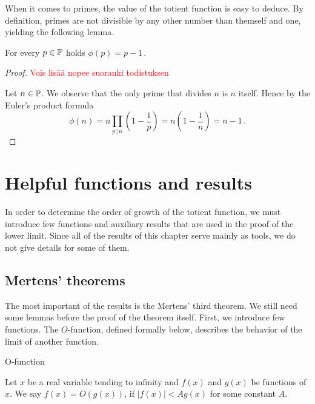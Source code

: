 \documentclass{article}
\begin{document}
When it comes to primes, the value of the totient function is easy to deduce. By definition, primes are not divisible by any other number than themself and one, yielding the following lemma.

\begin{lemma}
\label{thm:phiprime}
For every $p \in \mathbb{P}$ holds $\phi(p) = p-1$\,.

\begin{proof}

\textcolor{red}{Vois lisää nopee suoranki todistuksen}

Let $n\in\mathbb{P}$. We observe that the only prime that divides $n$ is $n$ itself. Hence by the Euler's product formula
\begin{equation*}
    \phi(n) = n \prod_{p \,\vert\, n} \left(1 - \frac{1}{p}\right) = n\left(1-\frac{1}{n}\right) = n-1\,.
\end{equation*}

\end{proof}

\end{lemma}

\section{Helpful functions and results}
\label{apujutut}

In order to determine the order of growth of the totient function, we must introduce few functions and auxiliary results that are used in the proof of the lower limit. Since all of the results of this chapter serve mainly as tools, we do not give details for some of them.

\subsection{Mertens' theorems}

The most important of the results is the Mertens' third theorem. We still need some lemmas before the proof of the theorem itself. First, we introduce few functions. The $O$-function, defined formally below, describes the behavior of the limit of another function.

\begin{definition}
O-function

Let $x$ be a real variable tending to infinity and $f(x)$ and $g(x)$ be functions of $x$. We say $f(x)=O(g(x))$, if $\vert f(x) \vert < Ag(x)$ for some constant $A$.
\end{definition}
\end{document}
